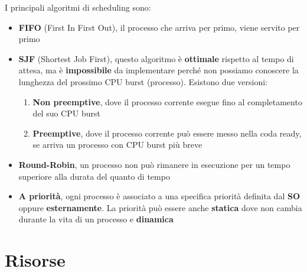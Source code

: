 \documentclass{article}
\begin{document}
I principali algoritmi di scheduling sono:
\begin{itemize}
  \item \textbf{FIFO} (First In First Out), il processo che arriva per primo, viene servito per primo
  \item \textbf{SJF} (Shortest Job First), questo algoritmo è \textbf{ottimale} rispetto al tempo di attesa, ma è \textbf{impossibile} da implementare perché non possiamo conoscere la lunghezza del prossimo CPU burst (processo). Esistono due versioni:
    \begin{enumerate}
      \item \textbf{Non preemptive}, dove il processo corrente esegue fino al completamento del suo CPU burst
      \item \textbf{Preemptive}, dove il processo corrente può essere messo nella coda ready, se arriva un processo con CPU burst più breve
    \end{enumerate}
  \item \textbf{Round-Robin}, un processo non può rimanere in esecuzione per un tempo superiore alla durata del quanto di tempo
  \item \textbf{A priorità}, ogni processo è associato a una specifica priorità definita dal \textbf{SO} oppure \textbf{esternamente}. La priorità può essere anche \textbf{statica} dove non cambia durante la vita di un processo e \textbf{dinamica}
\end{itemize}

\section{Risorse}
\end{document}

